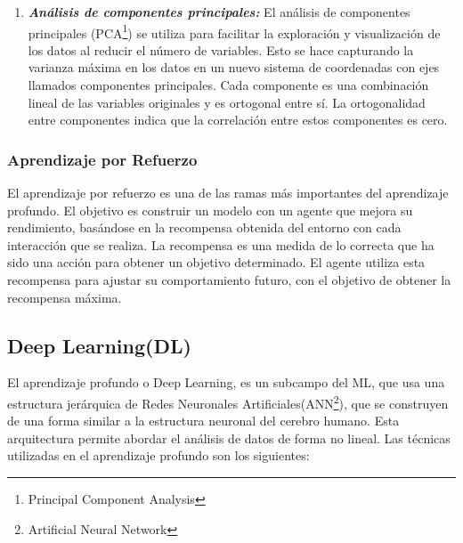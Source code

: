 \begin{enumerate}[label=\textbf{\arabic*})]
	\begin{enumerate}[label=\textbf{(\alph*)}]
		\item \textit{\textbf{Análisis de componentes principales:}}
		El análisis de componentes principales (PCA\footnote{Principal Component Analysis}) se utiliza para facilitar la exploración y visualización de los datos al reducir el número de variables. Esto se hace capturando la varianza máxima en los datos en un nuevo sistema de coordenadas con ejes llamados componentes principales. Cada componente es una combinación lineal de las variables originales y es ortogonal entre sí. La ortogonalidad entre componentes indica que la correlación entre estos componentes es cero\cite{Shaw2019}.
	\end{enumerate}
	
\end{enumerate}

\subsubsection{Aprendizaje por Refuerzo}

El aprendizaje por refuerzo es una de las ramas más importantes del aprendizaje profundo. El objetivo es construir un modelo con un agente que mejora su rendimiento, basándose en la recompensa obtenida del entorno con cada interacción que se realiza. La recompensa es una medida de lo correcta que ha sido una acción para obtener un objetivo determinado. El agente utiliza esta recompensa para ajustar su comportamiento futuro, con el objetivo de obtener la recompensa máxima\cite{BriegaLopez2015}. 

\subsection{Deep Learning(DL)}

El aprendizaje profundo o Deep Learning, es un subcampo del ML, que usa una estructura jerárquica de Redes Neuronales Artificiales(ANN\footnote{Artificial Neural Network}), que se construyen de una forma similar a la estructura neuronal del cerebro humano. Esta arquitectura permite abordar el análisis de datos de forma no lineal\cite{BriegaLopez2015}.  Las técnicas utilizadas en el aprendizaje profundo son los siguientes:

